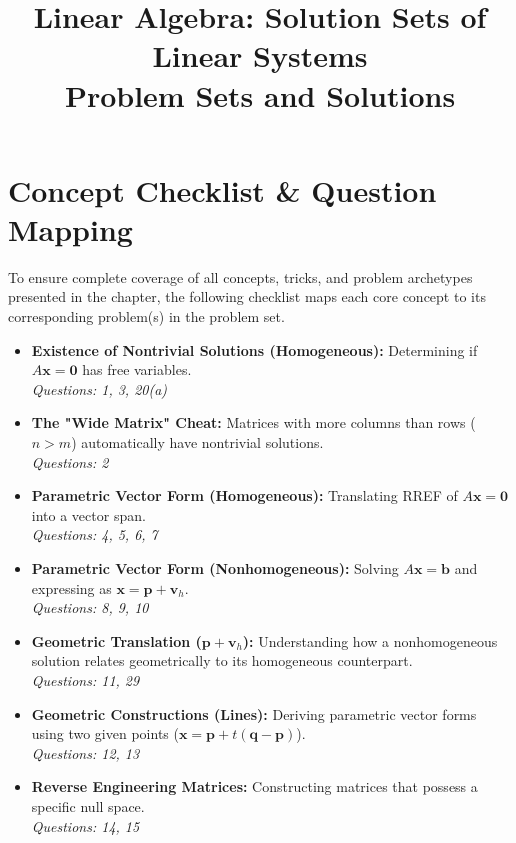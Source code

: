 \documentclass[12pt]{article}
\title{Linear Algebra: Solution Sets of Linear Systems \\ \large Problem Sets and Solutions}
\author{}
\date{}
\begin{document}
\maketitle
\tableofcontents
\newpage

\section{Concept Checklist \& Question Mapping}
To ensure complete coverage of all concepts, tricks, and problem archetypes presented in the chapter, the following checklist maps each core concept to its corresponding problem(s) in the problem set.

\begin{itemize}
    \item \textbf{Existence of Nontrivial Solutions (Homogeneous):} Determining if $A\mathbf{x} = \mathbf{0}$ has free variables. \\ \textit{Questions: 1, 3, 20(a)}
    \item \textbf{The "Wide Matrix" Cheat:} Matrices with more columns than rows ($n > m$) automatically have nontrivial solutions. \\ \textit{Questions: 2}
    \item \textbf{Parametric Vector Form (Homogeneous):} Translating RREF of $A\mathbf{x} = \mathbf{0}$ into a vector span. \\ \textit{Questions: 4, 5, 6, 7}
    \item \textbf{Parametric Vector Form (Nonhomogeneous):} Solving $A\mathbf{x} = \mathbf{b}$ and expressing as $\mathbf{x} = \mathbf{p} + \mathbf{v}_h$. \\ \textit{Questions: 8, 9, 10}
    \item \textbf{Geometric Translation ($\mathbf{p} + \mathbf{v}_h$):} Understanding how a nonhomogeneous solution relates geometrically to its homogeneous counterpart. \\ \textit{Questions: 11, 29}
    \item \textbf{Geometric Constructions (Lines):} Deriving parametric vector forms using two given points ($\mathbf{x} = \mathbf{p} + t(\mathbf{q} - \mathbf{p})$). \\ \textit{Questions: 12, 13}
    \item \textbf{Reverse Engineering Matrices:} Constructing matrices that possess a specific null space. \\ \textit{Questions: 14, 15}

\end{itemize}
\end{document}
